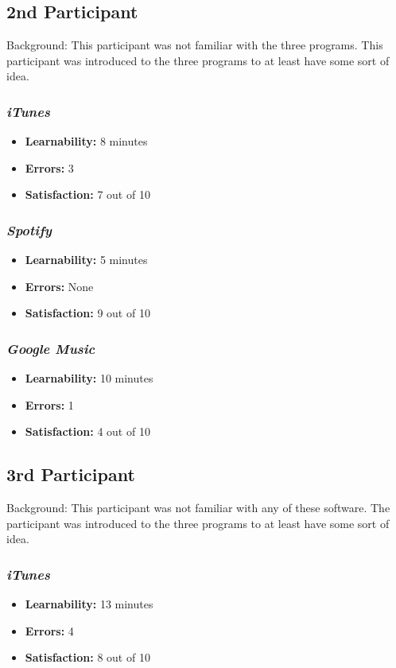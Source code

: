 \documentclass{article}
\begin{document}
{\begin{multicols}{2}
	
\subsection{2nd Participant}
Background: This participant was not familiar with the three programs. This participant was introduced to the three programs to at least have some sort of idea.

\subsubsection{\it iTunes}
\begin{itemize}
	\item {\bf Learnability:} 8 minutes
	\item {\bf Errors:} 3
	\item {\bf Satisfaction:} 7 out of 10 
\end{itemize}

\subsubsection{\it Spotify}
\begin{itemize}
	\item {\bf Learnability:} 5 minutes
	\item {\bf Errors:} None
	\item {\bf Satisfaction:} 9 out of 10 
\end{itemize}

\subsubsection{\it Google Music}
\begin{itemize}
\item {\bf Learnability:} 10 minutes
	\item {\bf Errors:} 1
	\item {\bf Satisfaction:} 4 out of 10 
\end{itemize}
	
\subsection{3rd Participant}
Background: This participant was not familiar with any of these software. The participant was introduced to the three programs to at least have some sort of idea.

\subsubsection{\it iTunes}
\begin{itemize}
	\item {\bf Learnability:} 13 minutes
	\item {\bf Errors:} 4
	\item {\bf Satisfaction:} 8 out of 10 
\end{itemize}


\end{multicols}}
\end{document}
